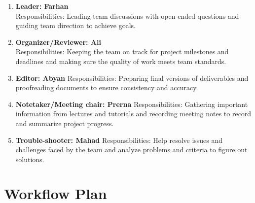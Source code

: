 \documentclass{article}
\begin{document}
\begin{enumerate}
    \item \textbf{Leader: Farhan} \\
    Responsibilities: Leading team discussions with open-ended questions and guiding team direction to achieve goals.
    \item \textbf{Organizer/Reviewer: Ali} \\
    Responsibilities: Keeping the team on track for project milestones and deadlines and making sure the quality of work meets team standards. \\
    \item \textbf{Editor: Abyan}
    Responsibilities: Preparing final versions of deliverables and proofreading documents to ensure consistency and accuracy. \\
    \item \textbf{Notetaker/Meeting chair: Prerna} 
    Responsibilities: Gathering important information from lectures and tutorials and recording meeting notes to record and summarize project progress. \\
    \item \textbf{Trouble-shooter: Mahad}
    Responsibilities: Help resolve issues and challenges faced by the team and analyze problems and criteria to figure out solutions.
\end{enumerate}





\section{Workflow Plan}
\end{document}
